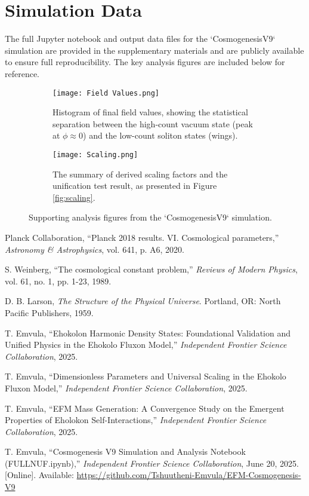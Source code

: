 \documentclass[11pt, twoside]{article}
\begin{document}
\appendix
\section{Simulation Data}
The full Jupyter notebook and output data files for the `CosmogenesisV9` simulation are provided in the supplementary materials and are publicly available to ensure full reproducibility. The key analysis figures are included below for reference.

\begin{figure}[h!]
    \centering
    \begin{subfigure}[b]{0.48\textwidth}
        \texttt{[image: Field Values.png]}
        \caption{Histogram of final field values, showing the statistical separation between the high-count vacuum state (peak at \(\phi \approx 0\)) and the low-count soliton states (wings).}
        \label{fig:field_values}
    \end{subfigure}
    \hfill
    \begin{subfigure}[b]{0.48\textwidth}
        \texttt{[image: Scaling.png]}
        \caption{The summary of derived scaling factors and the unification test result, as presented in Figure \ref{fig:scaling}.}
        \label{fig:scaling_appendix}
    \end{subfigure}
    \caption{Supporting analysis figures from the `CosmogenesisV9` simulation.}
\end{figure}



\begin{thebibliography}{9}
\raggedright

Planck Collaboration, ``Planck 2018 results. VI. Cosmological parameters,'' \textit{Astronomy \& Astrophysics}, vol. 641, p. A6, 2020.

S. Weinberg, ``The cosmological constant problem,'' \textit{Reviews of Modern Physics}, vol. 61, no. 1, pp. 1-23, 1989.

D. B. Larson, \textit{The Structure of the Physical Universe}. Portland, OR: North Pacific Publishers, 1959.

T. Emvula, ``Ehokolon Harmonic Density States: Foundational Validation and Unified Physics in the Ehokolo Fluxon Model,'' \textit{Independent Frontier Science Collaboration}, 2025.

T. Emvula, ``Dimensionless Parameters and Universal Scaling in the Ehokolo Fluxon Model,'' \textit{Independent Frontier Science Collaboration}, 2025.

T. Emvula, ``EFM Mass Generation: A Convergence Study on the Emergent Properties of Eholokon Self-Interactions,'' \textit{Independent Frontier Science Collaboration}, 2025.

T. Emvula, ``Cosmogenesis V9 Simulation and Analysis Notebook (FULLNUF.ipynb),'' \textit{Independent Frontier Science Collaboration}, June 20, 2025. [Online]. Available: \url{https://github.com/Tshuutheni-Emvula/EFM-Cosmogenesis-V9}

\end{thebibliography}
\end{document}
